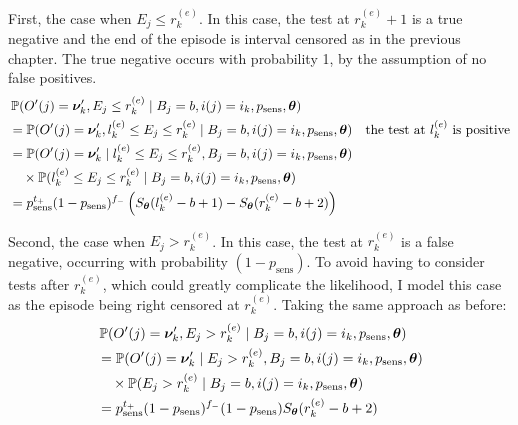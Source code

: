 \documentclass[thesis.tex]{subfiles}
\begin{document}
First, the case when $E_j \leq r_k^{(e)}$.
In this case, the test at $r_k^{(e)}+1$ is a true negative and the end of the episode is interval censored as in the previous chapter.
The true negative occurs with probability 1, by the assumption of no false positives.
\begin{align}
&\operatorname{\mathbb{P}}(O'(j) = \bm{\nu}_k', E_j \leq r_k^{(e)} \mid B_j = b, i(j) = i_k, p_\text{sens}, \bm{\theta}) \\
&= \operatorname{\mathbb{P}}(O'(j) = \bm{\nu}_k', l_k^{(e)} \leq E_j \leq r_k^{(e)} \mid B_j = b, i(j) = i_k, p_\text{sens}, \bm{\theta}) &\text{the test at $l_k^{(e)}$ is positive} \\
&= \operatorname{\mathbb{P}}(O'(j) = \bm{\nu}_k' \mid l_k^{(e)} \leq E_j \leq r_k^{(e)}, B_j = b, i(j) = i_k, p_\text{sens}, \bm{\theta}) \\
&\ \ \  \times \operatorname{\mathbb{P}}(l_k^{(e)} \leq E_j \leq r_k^{(e)} \mid B_j = b, i(j) = i_k, p_\text{sens}, \bm{\theta}) \\
&= p_\text{sens}^{t_+} (1 - p_\text{sens})^{f_-} \left( S_{\bm{\theta}}(l_k^{(e)} - b + 1) - S_{\bm{\theta}}(r_k^{(e)} - b + 2) \right)
\label{imperf-test:eq:ll-ei-lt-ri}
\end{align}

Second, the case when $E_j > r_k^{(e)}$.
In this case, the test at $r_k^{(e)}$ is a false negative, occurring with probability $(1 - p_\text{sens})$.
To avoid having to consider tests after $r_k^{(e)}$, which could greatly complicate the likelihood, I model this case as the episode being right censored at $r_k^{(e)}$.
Taking the same approach as before:
\begin{align}
&\operatorname{\mathbb{P}}(O'(j) = \bm{\nu}_k', E_j > r_k^{(e)} \mid B_j = b, i(j) = i_k, p_\text{sens}, \bm{\theta}) \\
&= \operatorname{\mathbb{P}}(O'(j) = \bm{\nu}_k' \mid E_j > r_k^{(e)}, B_j = b, i(j) = i_k, p_\text{sens}, \bm{\theta}) \\
  &\ \ \  \times \operatorname{\mathbb{P}}(E_j > r_k^{(e)} \mid B_j = b, i(j) = i_k, p_\text{sens}, \bm{\theta}) \\
&= p_\text{sens}^{t_+} (1 - p_\text{sens})^{f_-} (1 - p_\text{sens}) S_{\bm{\theta}}(r_k^{(e)} - b + 2)
\label{imperf-test:eq:ll-ei-gt-ri}
\end{align}
\end{document}

